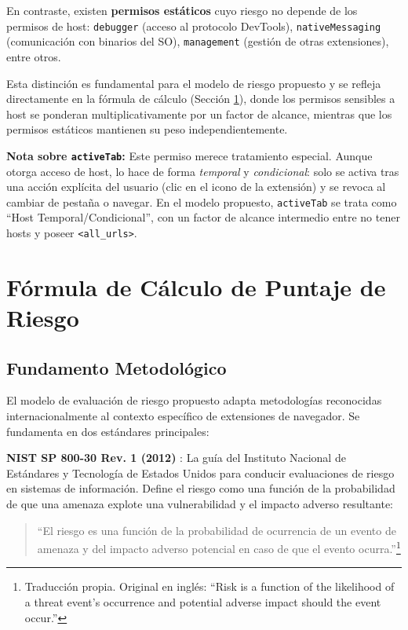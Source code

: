\documentclass[12pt,oneside]{report}
\begin{document}
En contraste, existen \textbf{permisos estáticos} cuyo riesgo no depende de los permisos de host: \texttt{debugger} (acceso al protocolo DevTools), \texttt{nativeMessaging} (comunicación con binarios del SO), \texttt{management} (gestión de otras extensiones), entre otros.

Esta distinción es fundamental para el modelo de riesgo propuesto y se refleja directamente en la fórmula de cálculo (Sección \ref{sec:formula}), donde los permisos sensibles a host se ponderan multiplicativamente por un factor de alcance, mientras que los permisos estáticos mantienen su peso independientemente.

\textbf{Nota sobre \texttt{activeTab}:} Este permiso merece tratamiento especial. Aunque otorga acceso de host, lo hace de forma \textit{temporal} y \textit{condicional}: solo se activa tras una acción explícita del usuario (clic en el icono de la extensión) y se revoca al cambiar de pestaña o navegar. En el modelo propuesto, \texttt{activeTab} se trata como ``Host Temporal/Condicional'', con un factor de alcance intermedio entre no tener hosts y poseer \texttt{<all\_urls>}.

\section{Fórmula de Cálculo de Puntaje de Riesgo}
\label{sec:formula}

\subsection{Fundamento Metodológico}

El modelo de evaluación de riesgo propuesto adapta metodologías reconocidas internacionalmente al contexto específico de extensiones de navegador. Se fundamenta en dos estándares principales:

\textbf{NIST SP 800-30 Rev. 1 (2012)} \cite{nist_sp800_30}: La guía del Instituto Nacional de Estándares y Tecnología de Estados Unidos para conducir evaluaciones de riesgo en sistemas de información. Define el riesgo como una función de la probabilidad de que una amenaza explote una vulnerabilidad y el impacto adverso resultante:

\begin{quote}
``El riesgo es una función de la probabilidad de ocurrencia de un evento de amenaza y del impacto adverso potencial en caso de que el evento ocurra.''\footnote{Traducción propia. Original en inglés: ``Risk is a function of the likelihood of a threat event's occurrence and potential adverse impact should the event occur.''} \cite{nist_sp800_30}
\end{quote}
\end{document}
